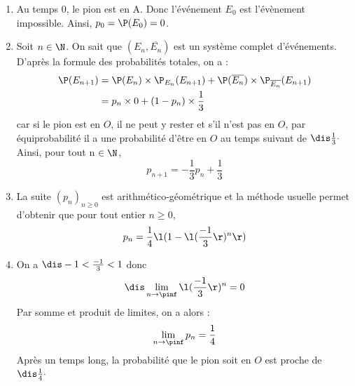 \documentclass[a4paper,10pt]{report}
\begin{document}
\corr \begin{enumerate}
\item Au temps 0, le pion est en A. Donc l'événement $E_0$ est l'évènement impossible. Ainsi, $p_0=\P(E_0)=0$.

\item Soit $n\in \N$. On sait que $(E_n, \overline{E_n})$ est un système complet d'événements. D'après la formule des probabilités totales, on a :
\begin{align*}
 \P(E_{n+1}) &= \P(E_n) \times \P_{E_n}(E_{n+1}) + \P(\overline{E_n}) \times \P_{\overline{E_n}}(E_{n+1})\\
 &= p_n \times 0 + (1-p_n) \times \frac 13
\end{align*}
car si le pion est en $O$, il ne peut y rester et s'il n'est pas en $O$, par équiprobabilité il a une probabilité d'être en $O$ au temps suivant de $\dis \frac 13 \cdot$ Ainsi, pour tout n $\in \N$, 
$$p_{n+1} = -\frac 13 p_n + \frac 13$$

\item La suite $(p_n)_{n \geq 0}$ est arithmético-géométrique et la méthode usuelle permet d'obtenir que pour tout entier $n \geq 0$,
$$ p_n = \frac 14 \l( 1 - \l(\frac{-1}{3}\r)^n\r) $$
\item On a $\dis -1 < \frac{-1}{3}<1$ donc 
$$\dis \lim_{n\to \pinf} \l(\frac{-1}{3}\r)^n = 0$$
Par somme et produit de limites, on a alors :
\[ \lim_{n\to \pinf} p_n = \frac 14 \]
Après un temps long, la probabilité que le pion soit en $O$ est proche de $ \dis \frac 14 \cdot$
\end{enumerate}
\end{document}
